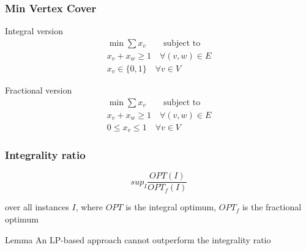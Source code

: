 \documentclass[12pt,aspectratio=169]{beamer}
\begin{document}
\begin{frame}\frametitle{Min Vertex Cover }
  \begin{block}{Integral version}
  \begin{equation}
    \begin{split}
      \min \sum x_{v} \qquad\text{subject to}\\
      x_{v} + x_{w} \ge 1\quad \forall (v,w)\in E\\
      x_{v}\in \{0,1\}\quad \forall v\in V
     \end{split}
   \end{equation}
 \end{block}
 \begin{block}{Fractional version}
  \begin{equation}
    \begin{split}
      \min \sum x_{v} \qquad\text{subject to}\\
      x_{v} + x_{w} \ge 1\quad \forall (v,w)\in E\\
      0\le x_{v}\le 1\quad \forall v\in V
     \end{split}
   \end{equation}
 \end{block}
\end{frame}


\begin{frame}\frametitle{Integrality ratio }
  \begin{equation}
    sup_{I} \frac{OPT(I)}{OPT_{f}(I)}
  \end{equation}

  over all instances $I$,
  where $OPT$ is the integral optimum, $OPT_{f}$ is the fractional optimum

  \begin{block}{Lemma}
    An LP-based approach cannot outperform the integrality ratio
  \end{block}
\end{frame}
\end{document}
